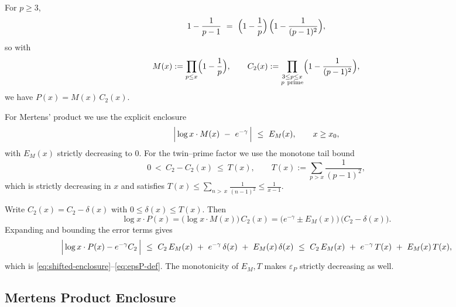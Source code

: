 \documentclass[11pt]{article}
\makeatletter
\theoremstyle{inline}
\theoremstyle{break}
\renewenvironment{proof}[1][\proofname]{%
  \par\pushQED{\qed}%
  \normalfont \topsep6\p@\@plus6\p@\relax
  \trivlist
  \item[\hskip\labelsep
        \itshape
    #1\@addpunct{.}]\mbox{}\\  %
}{%
  \popQED\endtrivlist\@endpefalse
}
\theoremstyle{break}
\theoremstyle{break}
\theoremstyle{break}
\theoremstyle{break}
\theoremstyle{break}
\theoremstyle{break}
\theoremstyle{inline}
\makeatother
\begin{document}
\begin{proof}
For \(p\ge 3\),
\begin{equation}\label{eq:factor-identity}
1-\frac{1}{p-1}
\ =\
\Bigl(1-\frac{1}{p}\Bigr)\,\Bigl(1-\frac{1}{(p-1)^2}\Bigr),
\end{equation}
so with
\begin{equation}\label{eq:M-and-C2-partial}
M(x):=\prod_{p\le x}\Bigl(1-\frac{1}{p}\Bigr),
\qquad
C_2(x):=\prod_{\substack{3\le p\le x\\ p\ \mathrm{prime}}}\Bigl(1-\frac{1}{(p-1)^2}\Bigr),
\end{equation}
we have \(P(x)=M(x)\,C_2(x)\).

For Mertens’ product we use the explicit enclosure
\begin{equation}\label{eq:EM-def}
\Bigl|\,\log x\cdot M(x)\ -\ e^{-\gamma}\,\Bigr|\ \le\ E_M(x),
\qquad x\ge x_0,
\end{equation}
with \(E_M(x)\) strictly decreasing to \(0\).  
For the twin–prime factor we use the monotone tail bound
\begin{equation}\label{eq:T-def}
0\ <\ C_2 - C_2(x)\ \le\ T(x),
\qquad
T(x):=\sum_{p>x}\frac{1}{(p-1)^2},
\end{equation}
which is strictly decreasing in \(x\) and satisfies \(T(x)\le \sum_{n>\,x}\frac{1}{(n-1)^2}\le \frac{1}{x-1}\).

Write \(C_2(x)=C_2-\delta(x)\) with \(0\le \delta(x)\le T(x)\).
Then
\begin{equation}\label{eq:linearization-step}
\log x\cdot P(x)
=\bigl(\log x\cdot M(x)\bigr)\,C_2(x)
=\bigl(e^{-\gamma}\pm E_M(x)\bigr)\,\bigl(C_2-\delta(x)\bigr).
\end{equation}
Expanding and bounding the error terms gives
\begin{equation}\label{eq:collect-errors}
\Bigl|\,\log x\cdot P(x)-e^{-\gamma}C_2\,\Bigr|
\ \le\ C_2\,E_M(x)\ +\ e^{-\gamma}\,\delta(x)\ +\ E_M(x)\,\delta(x)
\ \le\ C_2\,E_M(x)\ +\ e^{-\gamma}\,T(x)\ +\ E_M(x)\,T(x),
\end{equation}
which is \eqref{eq:shifted-enclosure}–\eqref{eq:epsP-def}.  
The monotonicity of \(E_M,T\) makes \(\varepsilon_P\) strictly decreasing as well.
\end{proof}


\subsection{Mertens Product Enclosure}\label{app:mertens}
\end{document}
